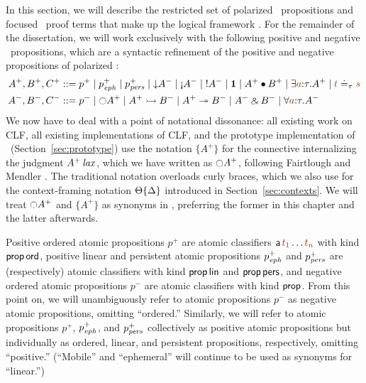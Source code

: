 In this section, we will describe the restricted set of polarized
\ollll~propositions and focused \ollll~proof terms that make up the
logical framework \sls. For the remainder of the dissertation, we will work
exclusively with the following positive and negative
\sls~propositions, which are a syntactic refinement of the positive
and negative propositions of polarized \ollll:
\begin{align*}
A^+, B^+, C^+ & ::= p^+ \mid p^+_\meph \mid p^+_\mpers \mid {\downarrow}A^-
  \mid {\gnab}A^- \mid {!}A^- \mid \one \mid A^+ \fuse B^+
  \mid \exists \lf{a}{:}\tau.A^+ \mid \lf{t} \doteq_\tau \lf{s}
\\
A^-, B^-, C^- & ::= p^- \mid {\ocircle}A^+ \mid A^+ \lefti B^- 
  \mid A^+ \righti B^- \mid A^- \with B^-
  \mid \forall \lf{a}{:}\tau.A^-
\end{align*}
We now have to deal with a point of notational dissonance: all
existing work on CLF, all existing implementations of CLF, and the
prototype implementation of \sls~(Section~\ref{sec:prototype}) use the
notation $\{ A^+ \}$ for the connective internalizing the judgment
${A^+}\,{{\it lax}}$, which we have written as ${\ocircle}A^+$, following
Fairtlough and Mendler \cite{fairtlough95propositional}. The
traditional notation overloads curly braces, which we also use for
the context-framing notation 
${\Theta}\{{\Delta}\}$ introduced in Section~\ref{sec:contexts}. We
will treat ${\ocircle}A^+$ and $\{ A^+ \}$ as synonyms in \sls, preferring the
former in this chapter and the latter afterwards.

Positive ordered atomic propositions $p^+$ are atomic classifiers
${\sf a}\,\lf{t_1}\ldots\lf{t_n}$ with kind ${\sf prop}\,{\sf ord}$,
positive linear and persistent atomic propositions $p^+_{\it eph}$ and
$p^+_{\it pers}$ are (respectively) atomic classifiers with kind ${\sf
  prop}\,{\sf lin}$ and ${\sf prop}\,{\sf pers}$, and negative ordered
atomic propositions $p^-$ are atomic classifiers with kind ${\sf
  prop}$.  From this point on, we will unambiguously refer to atomic
propositions $p^-$ as negative atomic propositions, omitting
``ordered.'' Similarly, we will refer to atomic propositions $p^+$,
$p^+_{\it eph}$, and $p^+_{\it pers}$ collectively as positive atomic
propositions but individually as ordered, linear, and persistent
propositions, respectively, omitting ``positive.''  (``Mobile'' and
``ephemeral'' will continue to be used as synonyms for ``linear.'')

